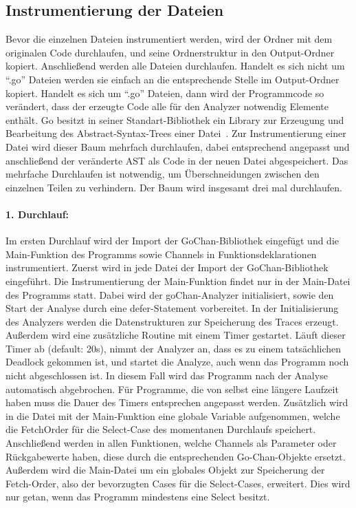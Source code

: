 \subsection{Instrumentierung der Dateien}
Bevor die einzelnen Dateien instrumentiert werden, wird der Ordner mit 
dem originalen Code durchlaufen, und seine Ordnerstruktur in den 
Output-Ordner kopiert. Anschließend werden alle Dateien durchlaufen.
Handelt es sich nicht um ``.go'' Dateien werden sie einfach an die entsprechende 
Stelle im Output-Ordner kopiert. Handelt es sich um ``.go'' Dateien, dann wird 
der Programmcode so verändert, dass der erzeugte Code alle für den Analyzer 
notwendig Elemente enthält. Go besitzt in seiner Standart-Bibliothek ein 
Library zur Erzeugung und Bearbeitung des Abstract-Syntax-Trees einer 
Datei~\cite{ast-spec}. Zur Instrumentierung einer Datei wird dieser Baum 
mehrfach durchlaufen, dabei entsprechend angepasst und anschließend der 
veränderte AST als Code in der neuen Datei abgespeichert. Das mehrfache Durchlaufen 
ist notwendig, um Überschneidungen zwischen den einzelnen Teilen zu verhindern.
Der Baum wird insgesamt drei mal durchlaufen.
\paragraph{1. Durchlauf:} Im ersten Durchlauf wird der Import der 
GoChan-Bibliothek eingefügt und die Main-Funktion des 
Programms sowie Channels in Funktionsdeklarationen instrumentiert.
Zuerst wird in jede Datei der Import der GoChan-Bibliothek eingeführt.
Die Instrumentierung der Main-Funktion findet nur 
in der Main-Datei des Programms statt. Dabei wird der goChan-Analyzer initialisiert,
sowie den Start der Analyse durch eine defer-Statement vorbereitet. In der 
Initialisierung des Analyzers werden die Datenstrukturen zur Speicherung 
des Traces erzeugt. Außerdem wird eine zusätzliche Routine mit einem 
Timer gestartet. Läuft dieser Timer ab (default: 20s), nimmt der Analyzer an, 
dass es zu einem tatsächlichen Deadlock gekommen ist, und startet die Analyze, 
auch wenn das Programm noch nicht abgeschlossen ist. In diesem Fall wird das 
Programm nach der Analyse automatisch abgebrochen. Für Programme, die von 
selbst eine längere Laufzeit haben muss die Dauer des Timers entsprechen 
angepasst werden. Zusätzlich wird in die Datei mit der Main-Funktion eine 
globale Variable aufgenommen, welche die FetchOrder für die Select-Case 
des momentanen Durchlaufs speichert. Anschließend werden in allen Funktionen, 
welche Channels als Parameter oder Rückgabewerte haben, diese durch die 
entsprechenden Go-Chan-Objekte ersetzt. Außerdem wird die Main-Datei um ein 
globales Objekt zur Speicherung der Fetch-Order, also der bevorzugten Cases 
für die Select-Cases, erweitert. Dies wird nur getan, wenn das Programm 
mindestens eine Select besitzt.

